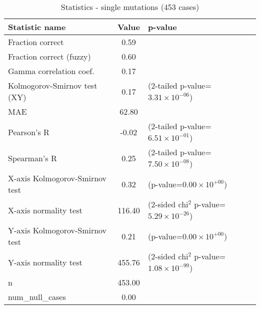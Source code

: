 \documentclass[10pt, letterpaper, oneside, titlepage, landscape]{scrreprt}
\begin{document}
\begin{table}[H]\begin{center}
\begin{tabular}{ l S[table-format=3.2] l}
Statistic name & {Value} & p-value\\
\hline
Fraction correct & 0.59 & \\
Fraction correct (fuzzy) & 0.60 & \\
Gamma correlation coef. & 0.17 & \\
Kolmogorov-Smirnov test (XY) & 0.17 & (2-tailed p-value=$3.31\times10^{-06}$)\\
MAE & 62.80 & \\
Pearson's R & -0.02 & (2-tailed p-value=$6.51\times10^{-01}$)\\
Spearman's R & 0.25 & (2-tailed p-value=$7.50\times10^{-08}$)\\
X-axis Kolmogorov-Smirnov test & 0.32 & (p-value=$0.00\times10^{+00}$)\\
X-axis normality test & 116.40 & (2-sided chi$^{2}$ p-value=$5.29\times10^{-26}$)\\
Y-axis Kolmogorov-Smirnov test & 0.21 & (p-value=$0.00\times10^{+00}$)\\
Y-axis normality test & 455.76 & (2-sided chi$^{2}$ p-value=$1.08\times10^{-99}$)\\
n & 453.00 & \\
num\_null\_cases & 0.00 & \\
\end{tabular}
\caption{Statistics - single mutations (453 cases)}
\end{center}\end{table}
\end{document}
